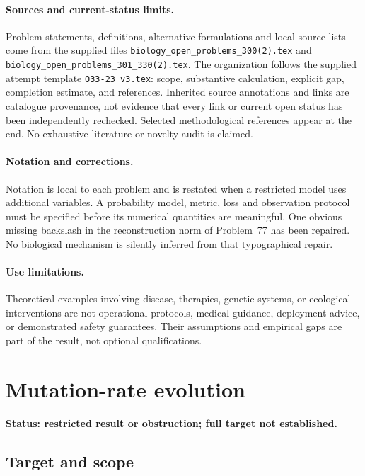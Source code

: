 \documentclass[11pt]{article}
\begin{document}
\paragraph{Sources and current-status limits.}
Problem statements, definitions, alternative formulations and local source lists
come from the supplied files
\texttt{biology\_open\_problems\_300(2).tex} and
\texttt{biology\_open\_problems\_301\_330(2).tex}.
The organization follows the supplied attempt template
\texttt{O33-23\_v3.tex}: scope, substantive calculation, explicit gap,
completion estimate, and references. Inherited source annotations and links are
catalogue provenance, not evidence that every link or current open status has
been independently rechecked. Selected methodological references appear at the
end. No exhaustive literature or novelty audit is claimed.

\paragraph{Notation and corrections.}
Notation is local to each problem and is restated when a restricted model uses
additional variables. A probability model, metric, loss and observation protocol
must be specified before its numerical quantities are meaningful. One obvious
missing backslash in the reconstruction norm of Problem~77 has been repaired.
No biological mechanism is silently inferred from that typographical repair.

\paragraph{Use limitations.}
Theoretical examples involving disease, therapies, genetic systems, or ecological
interventions are not operational protocols, medical guidance, deployment advice,
or demonstrated safety guarantees. Their assumptions and empirical gaps are part
of the result, not optional qualifications.


\section*{Mutation-rate evolution}
\label{prob:169}
\noindent\textbf{Status: restricted result or obstruction; full target not established.}
\subsection{Target and scope}
\end{document}
